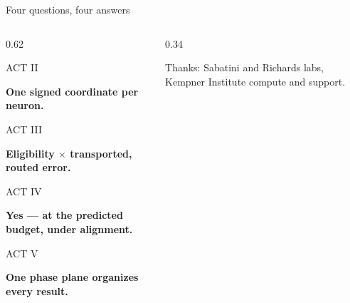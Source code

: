 \begin{frame}{Four questions, four answers}
  \begin{columns}[T,onlytextwidth]
    \begin{column}{0.62\textwidth}
      \vspace{0.10cm}
      {\scriptsize\color{Mute}ACT II\par}
      {\small\bfseries One signed coordinate per neuron.\par}
      \vspace{0.26cm}
      {\scriptsize\color{Mute}ACT III\par}
      {\small\bfseries Eligibility $\times$ transported, routed error.\par}
      \vspace{0.26cm}
      {\scriptsize\color{Mute}ACT IV\par}
      {\small\bfseries Yes --- at the predicted budget, under alignment.\par}
      \vspace{0.26cm}
      {\scriptsize\color{Mute}ACT V\par}
      {\small\bfseries One phase plane organizes every result.\par}
    \end{column}
    \begin{column}{0.34\textwidth}
      \centering
      \vspace{0.30cm}
      \par
      \vspace{0.55cm}
      {\scriptsize\color{Mute}Thanks: Sabatini and Richards labs, Kempner
       Institute compute and support.\par}
    \end{column}
  \end{columns}
  \vfill
  \vspace{0.04cm}
\end{frame}
